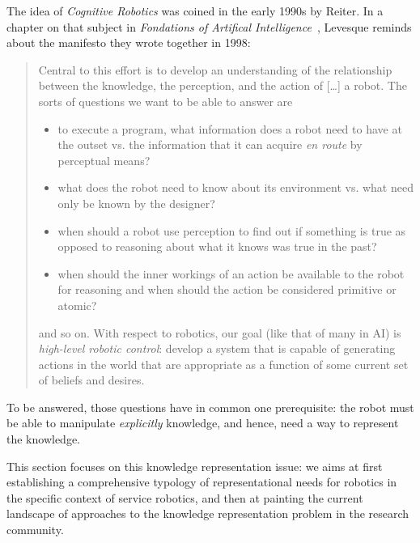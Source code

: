 The idea of \emph{Cognitive Robotics} was coined in the early 1990s by Reiter.
In a chapter on that subject in \emph{Fondations of Artifical
Intelligence}~\cite{Levesque2008}, Levesque reminds about the manifesto they
wrote together in 1998:

\begin{quotation}

    Central to this effort is to develop an understanding of the relationship
    between the knowledge, the perception, and the action of [\ldots] a robot. The
    sorts of questions we want to be able to answer are

    \begin{itemize} 

        \item to execute a program, what information does a robot need to have
        at the outset vs. the information that it can acquire \emph{en route}
        by perceptual means?

        \item what does the robot need to know about its environment vs. what
        need only be known by the designer?

        \item when should a robot use perception to find out if something is
        true as opposed to reasoning about what it knows was true in the past?

        \item when should the inner workings of an action be available to the
        robot for reasoning and when should the action be considered primitive
        or atomic?

    \end{itemize}

    and so on. With respect to robotics, our goal (like that of many in AI) is
    \emph{high-level robotic control}: develop a system that is capable of
    generating actions in the world that are appropriate as a function of some
    current set of beliefs and desires.

\end{quotation}

To be answered, those questions have in common one prerequisite: the robot must
be able to manipulate \emph{explicitly} knowledge, and hence, need a way to
represent the knowledge.

This section focuses on this knowledge representation issue: we aims at first
establishing a comprehensive typology of representational needs for
robotics in the specific context of service robotics, and then at painting the
current landscape of approaches to the knowledge representation problem in the
research community.

